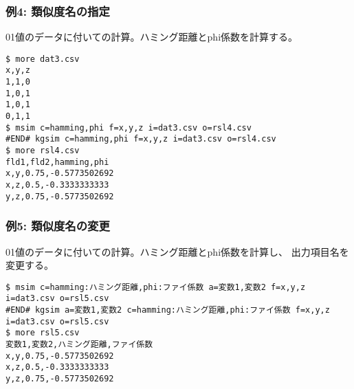 \subsubsection*{例4: 類似度名の指定}

01値のデータに付いての計算。ハミング距離とphi係数を計算する。


\begin{Verbatim}[baselinestretch=0.7,frame=single]
$ more dat3.csv
x,y,z
1,1,0
1,0,1
1,0,1
0,1,1
$ msim c=hamming,phi f=x,y,z i=dat3.csv o=rsl4.csv
#END# kgsim c=hamming,phi f=x,y,z i=dat3.csv o=rsl4.csv
$ more rsl4.csv
fld1,fld2,hamming,phi
x,y,0.75,-0.5773502692
x,z,0.5,-0.3333333333
y,z,0.75,-0.5773502692
\end{Verbatim}
\subsubsection*{例5: 類似度名の変更}

01値のデータに付いての計算。ハミング距離とphi係数を計算し、
出力項目名を変更する。


\begin{Verbatim}[baselinestretch=0.7,frame=single]
$ msim c=hamming:ハミング距離,phi:ファイ係数 a=変数1,変数2 f=x,y,z i=dat3.csv o=rsl5.csv
#END# kgsim a=変数1,変数2 c=hamming:ハミング距離,phi:ファイ係数 f=x,y,z i=dat3.csv o=rsl5.csv
$ more rsl5.csv
変数1,変数2,ハミング距離,ファイ係数
x,y,0.75,-0.5773502692
x,z,0.5,-0.3333333333
y,z,0.75,-0.5773502692
\end{Verbatim}
